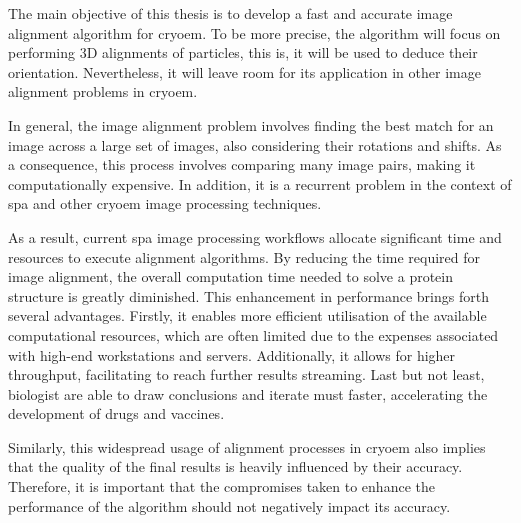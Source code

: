 \documentclass[../main.tex]{subfiles}
\begin{document}
The main objective of this thesis is to develop a fast and accurate image alignment algorithm for \gls{cryoem}. To be more precise, the algorithm will focus on performing 3D alignments of particles, this is, it will be used to deduce their orientation. Nevertheless, it will leave room for its application in other image alignment problems in \gls{cryoem}.

In general, the image alignment problem involves finding the best match for an image across a large set of images, also considering their rotations and shifts. As a consequence, this process involves comparing many image pairs, making it computationally expensive. In addition, it is a recurrent problem in the context of \gls{spa} and other \gls{cryoem} image processing techniques.

As a result, current \gls{spa} image processing workflows allocate significant time and resources to execute alignment algorithms. By reducing the time required for image alignment, the overall computation time needed to solve a protein structure is greatly diminished. This enhancement in performance brings forth several advantages. Firstly, it enables more efficient utilisation of the available computational resources, which are often limited due to the expenses associated with high-end workstations and servers. Additionally, it allows for higher throughput, facilitating to reach further results streaming. Last but not least, biologist are able to draw conclusions and iterate must faster, accelerating the development of drugs and vaccines.

Similarly, this widespread usage of alignment processes in \gls{cryoem} also implies that the
quality of the final results is heavily influenced by their accuracy. Therefore, it is important that the compromises taken to enhance the performance of the algorithm should not negatively impact its accuracy.
\end{document}
